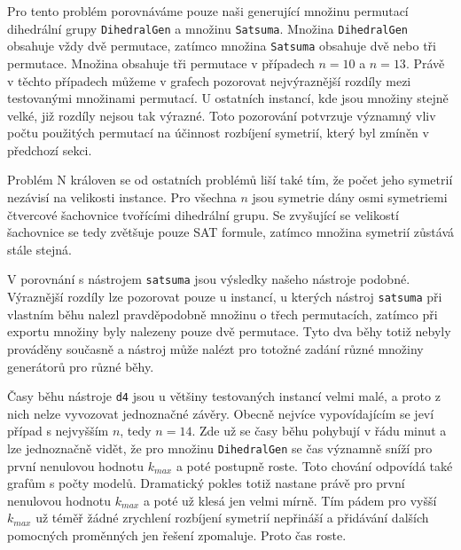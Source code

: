 Pro tento problém porovnáváme pouze naši generující množinu permutací dihedrální grupy \texttt{DihedralGen} a množinu \texttt{Satsuma}. Množina \texttt{DihedralGen} obsahuje vždy dvě permutace, zatímco množina \texttt{Satsuma} obsahuje dvě nebo tři permutace. Množina obsahuje tři permutace v případech $n=10$ a $n=13$. Právě v těchto případech můžeme v grafech pozorovat nejvýraznější rozdíly mezi testovanými množinami permutací. U ostatních instancí, kde jsou množiny stejně velké, již rozdíly nejsou tak výrazné. Toto pozorování potvrzuje významný vliv počtu použitých permutací na účinnost rozbíjení symetrií, který byl zmíněn v předchozí sekci.

Problém N královen se od ostatních problémů liší také tím, že počet jeho symetrií nezávisí na velikosti instance. Pro všechna $n$ jsou symetrie dány osmi symetriemi čtvercové šachovnice tvořícími dihedrální grupu. Se zvyšující se velikostí šachovnice se tedy zvětšuje pouze SAT formule, zatímco množina symetrií zůstává stále stejná.

V porovnání s nástrojem \texttt{satsuma} jsou výsledky našeho nástroje podobné. Výraznější rozdíly lze pozorovat pouze u instancí, u kterých nástroj \texttt{satsuma} při vlastním běhu nalezl pravděpodobně množinu o třech permutacích, zatímco při exportu množiny byly nalezeny pouze dvě permutace. Tyto dva běhy totiž nebyly prováděny současně a nástroj může nalézt pro totožné zadání různé množiny generátorů pro různé běhy. 

Časy běhu nástroje \texttt{d4} jsou u většiny testovaných instancí velmi malé, a proto z nich nelze vyvozovat jednoznačné závěry. Obecně nejvíce vypovídajícím se jeví případ s nejvyšším $n$, tedy $n=14$. Zde už se časy běhu pohybují v řádu minut a lze jednoznačně vidět, že pro množinu \texttt{DihedralGen} se čas významně sníží pro první nenulovou hodnotu $k_{max}$ a poté postupně roste. Toto chování odpovídá také grafům s počty modelů. Dramatický pokles totiž nastane právě pro první nenulovou hodnotu $k_{max}$ a poté už klesá jen velmi mírně. Tím pádem pro vyšší $k_{max}$ už téměř žádné zrychlení rozbíjení symetrií nepřináší a přidávání dalších pomocných proměnných jen řešení zpomaluje. Proto čas roste.

